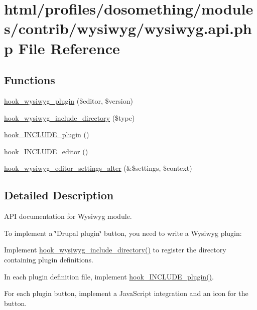\hypertarget{wysiwyg_8api_8php}{
\section{html/profiles/dosomething/modules/contrib/wysiwyg/wysiwyg.api.php File Reference}
\label{wysiwyg_8api_8php}
}
\subsection*{Functions}
\begin{DoxyCompactItemize}
\item 
\hyperlink{wysiwyg_8api_8php_abad2b35b32be0b20d73006b73205045c}{hook\_\-wysiwyg\_\-plugin} (\$editor, \$version)
\item 
\hyperlink{wysiwyg_8api_8php_a6cfdf97fd9de777197d9bae384755aac}{hook\_\-wysiwyg\_\-include\_\-directory} (\$type)
\item 
\hyperlink{wysiwyg_8api_8php_a20be879b59430637a6832dbbc221eb7c}{hook\_\-INCLUDE\_\-plugin} ()
\item 
\hyperlink{wysiwyg_8api_8php_ad3605f8cb948779e59e72c711a7ff843}{hook\_\-INCLUDE\_\-editor} ()
\item 
\hyperlink{wysiwyg_8api_8php_a5a5a169876eb8a8f2d19c214408d1072}{hook\_\-wysiwyg\_\-editor\_\-settings\_\-alter} (\&\$settings, \$context)
\end{DoxyCompactItemize}


\subsection{Detailed Description}
API documentation for Wysiwyg module.

To implement a \char`\"{}Drupal plugin\char`\"{} button, you need to write a Wysiwyg plugin:
\begin{DoxyItemize}
\item Implement \hyperlink{wysiwyg_8api_8php_a6cfdf97fd9de777197d9bae384755aac}{hook\_\-wysiwyg\_\-include\_\-directory()} to register the directory containing plugin definitions.
\item In each plugin definition file, implement \hyperlink{wysiwyg_8api_8php_a20be879b59430637a6832dbbc221eb7c}{hook\_\-INCLUDE\_\-plugin()}.
\item For each plugin button, implement a JavaScript integration and an icon for the button.
\end{DoxyItemize}

